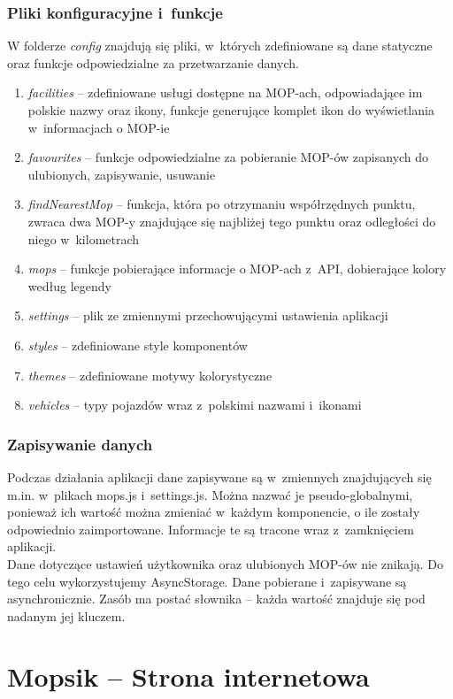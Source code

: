 \subsection{Pliki konfiguracyjne i~funkcje}
W folderze \textit{config} znajdują się pliki, w~których zdefiniowane są dane statyczne oraz funkcje odpowiedzialne za przetwarzanie danych.
\begin{enumerate}
\item \textit{facilities} -- zdefiniowane usługi dostępne na MOP-ach, odpowiadające im polskie nazwy oraz ikony, funkcje generujące komplet ikon do wyświetlania w~informacjach o MOP-ie
\item \textit{favourites} -- funkcje odpowiedzialne za pobieranie MOP-ów zapisanych do ulubionych, zapisywanie, usuwanie
\item \textit{findNearestMop} -- funkcja, która po otrzymaniu współrzędnych punktu, zwraca dwa MOP-y znajdujące się najbliżej tego punktu oraz odległości do niego w~kilometrach
\item \textit{mops} -- funkcje pobierające informacje o MOP-ach z~API, dobierające kolory według legendy
\item \textit{settings} -- plik ze zmiennymi przechowującymi ustawienia aplikacji
\item \textit{styles} -- zdefiniowane style komponentów
\item \textit{themes} -- zdefiniowane motywy kolorystyczne
\item \textit{vehicles} -- typy pojazdów wraz z~polskimi nazwami i~ikonami
\end{enumerate}

\subsection{Zapisywanie danych}
Podczas działania aplikacji dane zapisywane są w~zmiennych znajdujących się m.in. w~plikach mops.js i~settings.js. Można nazwać je pseudo-globalnymi, ponieważ ich wartość można zmieniać w~każdym komponencie, o ile zostały odpowiednio zaimportowane. Informacje te są tracone wraz z~zamknięciem aplikacji.\\
Dane dotyczące ustawień użytkownika oraz ulubionych MOP-ów nie znikają. Do tego celu wykorzystujemy AsyncStorage. Dane pobierane i~zapisywane są asynchronicznie. Zasób ma postać słownika -- każda wartość znajduje się pod nadanym jej kluczem.


\chapter{Mopsik -- Strona internetowa}
\label{mopsik_web}

